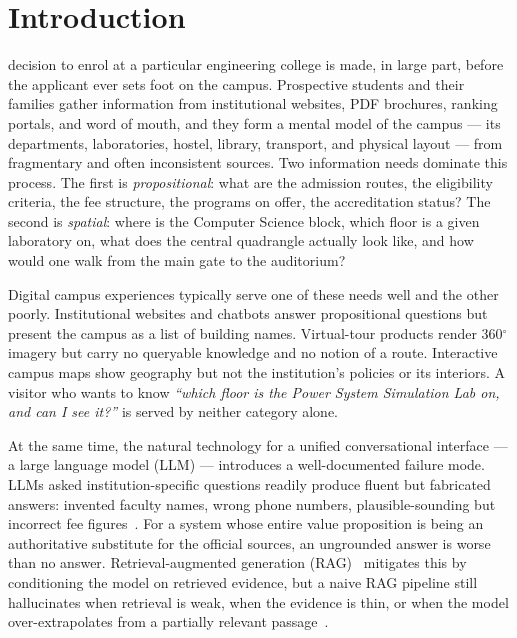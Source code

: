 \section{Introduction}
 decision to enrol at a particular engineering college
is made, in large part, before the applicant ever sets foot on the campus.
Prospective students and their families gather information from institutional
websites, PDF brochures, ranking portals, and word of mouth, and they form
a mental model of the campus --- its departments, laboratories, hostel,
library, transport, and physical layout --- from fragmentary and often
inconsistent sources. Two information needs dominate this process. The
first is \emph{propositional}: what are the admission routes, the eligibility
criteria, the fee structure, the programs on offer, the accreditation
status? The second is \emph{spatial}: where is the Computer Science block,
which floor is a given laboratory on, what does the central quadrangle
actually look like, and how would one walk from the main gate to the
auditorium?

Digital campus experiences typically serve one of these needs well and the
other poorly. Institutional websites and chatbots answer propositional
questions but present the campus as a list of building names. Virtual-tour
products render 360$^{\circ}$ imagery but carry no queryable knowledge and
no notion of a route. Interactive campus maps show geography but not the
institution's policies or its interiors. A visitor who wants to know
\emph{``which floor is the Power System Simulation Lab on, and can I see
it?''} is served by neither category alone.

At the same time, the natural technology for a unified conversational
interface --- a large language model (LLM) --- introduces a well-documented
failure mode. LLMs asked institution-specific questions readily produce
fluent but fabricated answers: invented faculty names, wrong phone numbers,
plausible-sounding but incorrect fee figures~\cite{ji2023hallucination}.
For a system whose entire value proposition is being an authoritative
substitute for the official sources, an ungrounded answer is worse than no
answer. Retrieval-augmented generation (RAG)~\cite{lewis2020rag} mitigates
this by conditioning the model on retrieved evidence, but a naive RAG
pipeline still hallucinates when retrieval is weak, when the evidence is
thin, or when the model over-extrapolates from a partially relevant
passage~\cite{shuster2021retrieval,gao2023ragsurvey}.

